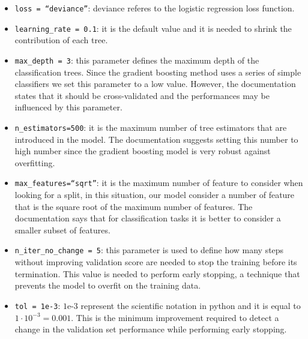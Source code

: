 \documentclass[../../Thesis.tex]{subfiles}
\begin{document}
			\begin{itemize}
				\item \verb|loss = “deviance”|: deviance referes to the logistic regression loss function.
				\item \verb|learning_rate = 0.1|: it is the default value and it is needed to shrink the contribution of each tree.
				\item \verb|max_depth = 3|: this parameter defines the maximum depth of the classification trees. Since the gradient boosting method uses a series of simple classifiers we set this parameter to a low value. However, the documentation states that it should be cross-validated and the performances may be influenced by this parameter.
				\item \verb|n_estimators=500|: it is the maximum number of tree estimators that are introduced in the model. The documentation suggests setting this number to high number since the gradient boosting model is very robust against overfitting.
				\item \verb|max_features=“sqrt”|: it is the maximum number of feature to consider when looking for a split, in this situation, our model consider a number of feature that is the square root of the maximum number of features. The documentation says that for classification tasks it is better to consider a smaller subset of features.
				\item \verb|n_iter_no_change = 5|: this parameter is used to define how many steps without improving validation score are needed to stop the training before its termination. This value is needed to perform early stopping, a technique that prevents the model to overfit on the training data.
				\item \verb|tol = 1e-3|: $1\text{e-}3$ represent the scientific notation in python and it is equal to $1 \cdot 10^{-3} = 0.001$. This is the minimum improvement required to detect a change in the validation set performance while performing early stopping. 
			\end{itemize}
\end{document}
